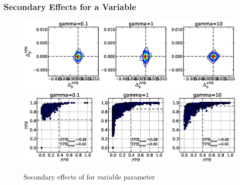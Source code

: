 \clearpage
\subsubsection{Secondary Effects for a Variable }

\begin{figure}[!h]
\begin{center}
\includegraphics[width=6in]{../fig/final/delta_hist_sec/w_smooth/gamma}
\includegraphics[width=5.5in]{../fig/final/position/all_allowed/w_smooth/gamma}
\end{center}
\caption{\label{fig:delta_sec6} Secondary effects of  for
  variable parameter }
\end{figure}

